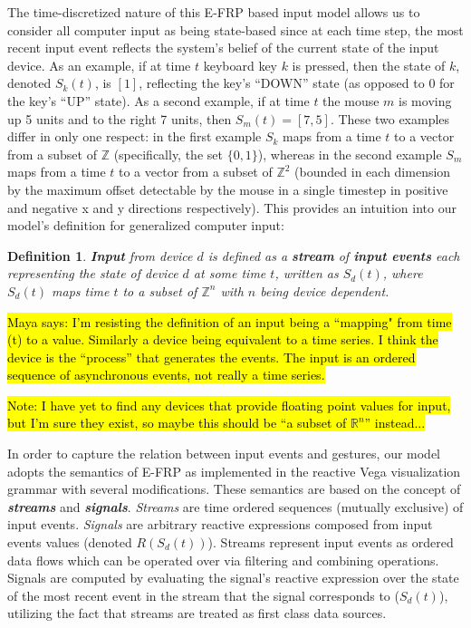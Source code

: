 \documentclass{article}
\newcommand{\Z}{\mathbb{Z}}
\newcommand{\R}{\mathbb{R}}
\newtheorem{define}{Definition}
\begin{document}
The time-discretized nature of this E-FRP based input model allows us to consider all computer input as being state-based since at each time step, the most recent input event reflects the system's belief of the current state of the input device.
As an example, if at time $t$ keyboard key $k$ is pressed, then the state of $k$, denoted $S_k(t)$, is $[1]$, reflecting the key's ``DOWN'' state (as opposed to $0$ for the key's ``UP'' state). As a second example, if at time $t$ the mouse $m$ is moving up 5 units and to the right 7 units, then $S_m(t) = [7, 5]$. These two examples differ in only one respect: in the first example $S_k$ maps from a time $t$ to a vector from a subset of $\Z$ (specifically, the set $\{0, 1\}$), whereas in the second example $S_m$ maps from a time $t$ to a vector from a subset of $\Z^2$ (bounded in each dimension by the maximum offset detectable by the mouse in a single timestep in positive and negative x and y directions respectively). This provides an intuition into our model's definition for generalized computer input:

\begin{define}
\textbf{Input} from device $d$ is defined as a \textbf{stream} of \textbf{input events} each representing the state of device $d$ at some time $t$, written as $S_d(t)$, where $S_d(t)$ maps time $t$ to a subset of $\Z^n$ with $n$ being device dependent.
\end{define}

\hl{\tiny Maya says: I'm resisting the definition of an input being a ``mapping" from time (t) to a value. Similarly a device being equivalent to a time series. I think the device is the ``process'' that generates the events. The input is an ordered sequence of asynchronous events, not really a time series. }

\hl{Note: I have yet to find any devices that provide floating point values for input, but I'm sure they exist, so maybe this should be ``a subset of $\R^n$'' instead...}

In order to capture the relation between input events and gestures, our model adopts the semantics of E-FRP as implemented in the reactive Vega visualization grammar \cite{satyanarayan2014declarative} with several modifications.
These semantics are based on the concept of \textbf{\textit{streams}} and \textbf{\textit{signals}}. {\em Streams} are time ordered sequences (mutually exclusive) of input events. {\em Signals} are arbitrary reactive expressions composed from input events values (denoted $R(S_d(t))$). Streams represent input events as ordered data flows which can be operated over via filtering and combining operations. Signals are computed by evaluating the signal's reactive expression over the state of the most recent event in the stream that the signal corresponds to ($S_d(t)$), utilizing the fact that streams are treated as first class data sources. 
\end{document}
